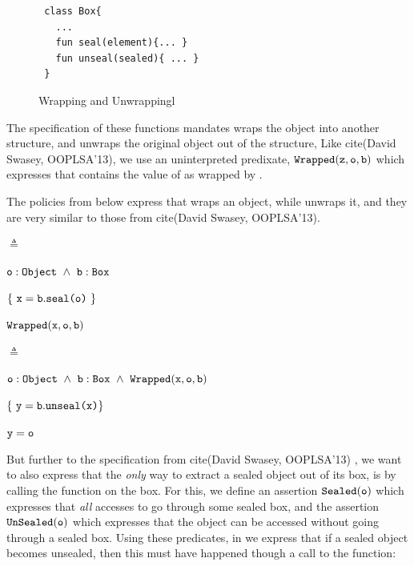 \begin{figure}[tbp]
\begin{lstlisting}
 class Box{
   ...
   fun seal(element){... }
   fun unseal(sealed){ ... }
 }

\end{lstlisting}
\caption{Wrapping and Unwrappingl}
\label{fig:WrapUnwrap}
 \end{figure}

The specification of these functions mandates  wraps the object into another structure, and  unwraps the original object out of the structure, Like cite(David Swasey, OOPLSA'13), we use an uninterpreted  predixate, ${\mbox{\tt{Wrapped}}}({\mbox{\tt{z}}},{\mbox{\tt{o}}},{\mbox{\tt{b}}})$ which expresses that  contains the value of  as wrapped by .

The policies from below express that  wraps an object, while  unwraps it, and they are very similar to those from cite(David Swasey, OOPLSA'13).

 $\triangleq$
\strut \hspace{2.1cm} $\prg{o}:\prg{Object}\ \wedge\ \prg{b}:\prg{Box}$  \\
\strut \hspace{6cm}$\{\ \prg{x} = \prg{b}.\prg{seal}\prg{(o)}\ \}$\\
\strut \hspace{5cm} ${\mbox{\tt{Wrapped}}}({\mbox{\tt{x}}},{\mbox{\tt{o}}},{\mbox{\tt{b}}})$

\hspace{.1cm}

 $\triangleq$
\strut \hspace{2.2cm}$\prg{o}:\prg{Object}\ \wedge\ \prg{b}:\prg{Box}\  \wedge\  \prg{Wrapped}(\prg{x},\prg{o},\prg{b})$\\
\strut \hspace{6cm}$ \{\ {\mbox{\tt{y}}} = {\mbox{\tt{b}}}.{\mbox{\tt{unseal}}}{\mbox{\tt{(x)}}} \}$\\
\strut \hspace{5cm} ${\mbox{\tt{y}}}={\mbox{\tt{o}}}$

\hspace{.1cm}

But further to the specification from cite(David Swasey, OOPLSA'13) ,
we want to also express that the {\em only} way to extract a sealed object
 out of its box, is by calling the  function on the box. For this, we
 define an assertion ${\mbox{\tt{Sealed}}}({\mbox{\tt{o}}})$ which expresses that {\em all} accesses to 
go through some sealed box, and the assertion ${\mbox{\tt{UnSealed}}}({\mbox{\tt{o}}})$ which expresses that the object can be accessed without
going through a sealed box. Using these predicates, in   we express that if a sealed object
becomes unsealed, then this must have happened though a call to the  function:




